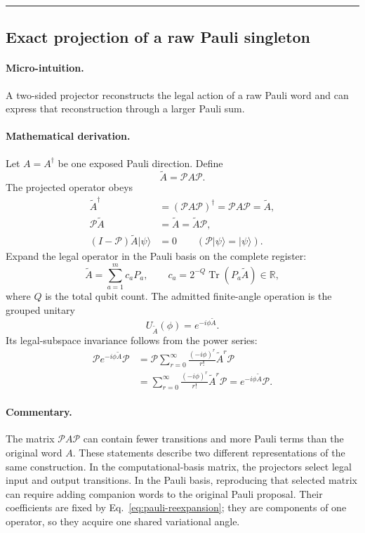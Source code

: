 \documentclass[10pt,twocolumn]{article}
\newcommand{\ket}[1]{\lvert #1\rangle}
\newcommand{\R}{\mathbb R}
\newcommand{\conceptbreak}{%
  \par\medskip\noindent
  {\color{black!30}\rule{\columnwidth}{0.35pt}}%
  \par\medskip}
\newcommand{\micro}{\paragraph{Micro-intuition.}}
\newcommand{\mathderiv}{\paragraph{Mathematical derivation.}}
\newcommand{\commentaryblock}{\paragraph{Commentary.}}
\begin{document}
\conceptbreak

\subsection*{Exact projection of a raw Pauli singleton}

\micro A two-sided projector reconstructs the legal action of a raw Pauli word
and can express that reconstruction through a larger Pauli sum.

\mathderiv Let \(A=A^\dagger\) be one exposed Pauli direction. Define
\begin{equation}
\widetilde A=\mathcal P A\mathcal P.
\label{eq:projected-generator}
\end{equation}
The projected operator obeys
\begin{align}
\widetilde A^\dagger
&=(\mathcal P A\mathcal P)^\dagger
=\mathcal P A\mathcal P=\widetilde A,\nonumber\\
\mathcal P\widetilde A
&=\widetilde A=\widetilde A\mathcal P,\nonumber\\
(I-\mathcal P)\widetilde A\ket\psi
&=0\qquad(\mathcal P\ket\psi=\ket\psi).
\label{eq:projected-invariants}
\end{align}
Expand the legal operator in the Pauli basis on the complete register:
\begin{equation}
\widetilde A=\sum_{a=1}^{m}c_aP_a,\qquad
c_a=2^{-Q}\operatorname{Tr}(P_a\widetilde A)\in\R,
\label{eq:pauli-reexpansion}
\end{equation}
where \(Q\) is the total qubit count. The admitted finite-angle operation is
the grouped unitary
\begin{equation}
U_{\widetilde A}(\phi)=e^{-i\phi\widetilde A}.
\label{eq:grouped-unitary}
\end{equation}
Its legal-subspace invariance follows from the power series:
\begin{align}
\mathcal P e^{-i\phi\widetilde A}\mathcal P
&=\mathcal P\sum_{r=0}^{\infty}
\frac{(-i\phi)^r}{r!}\widetilde A^r\mathcal P\nonumber\\
&=\sum_{r=0}^{\infty}
\frac{(-i\phi)^r}{r!}\widetilde A^r\mathcal P
=e^{-i\phi\widetilde A}\mathcal P.
\label{eq:grouped-invariance}
\end{align}

\commentaryblock The matrix \(\mathcal P A\mathcal P\) can contain fewer
transitions and more Pauli terms than the original word \(A\). These statements
describe two different representations of the same construction. In the
computational-basis matrix, the projectors select legal input and output
transitions. In the Pauli basis, reproducing that selected matrix can require
adding companion words to the original Pauli proposal. Their coefficients are
fixed by Eq.~\eqref{eq:pauli-reexpansion}; they are components of one operator,
so they acquire one shared variational angle.
\end{document}
